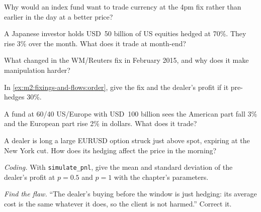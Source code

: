 \begin{exercise}[$\star$]\label{exo:m2:fixings-and-flows:1}
Why would an index fund want to trade currency at the 4pm fix rather than earlier
in the day at a better price?
\end{exercise}

\begin{exercise}[$\star$]\label{exo:m2:fixings-and-flows:2}
A Japanese investor holds USD~50 billion of US equities hedged at 70\%. They rise
3\% over the month. What does it trade at month-end?
\end{exercise}

\begin{exercise}[$\star$]\label{exo:m2:fixings-and-flows:3}
What changed in the WM/Reuters fix in February 2015, and why does it make
manipulation harder?
\end{exercise}

\begin{exercise}[$\star\star$]\label{exo:m2:fixings-and-flows:4}
In \cref{ex:m2:fixings-and-flows:order}, give the fix and the dealer's profit if
it pre-hedges 30\%.
\end{exercise}

\begin{exercise}[$\star\star$]\label{exo:m2:fixings-and-flows:5}
A fund at 60/40 US/Europe with USD~100 billion sees the American part fall 3\%
and the European part rise 2\% in dollars. What does it trade?
\end{exercise}

\begin{exercise}[$\star\star$]\label{exo:m2:fixings-and-flows:6}
A dealer is long a large EURUSD option struck just above spot, expiring at the
New York cut. How does its hedging affect the price in the morning?
\end{exercise}

\begin{exercise}[$\star\star\star$]\label{exo:m2:fixings-and-flows:7}
\emph{Coding.} With \texttt{simulate\_pnl}, give the mean and standard deviation of
the dealer's profit at $p = 0.5$ and $p = 1$ with the chapter's parameters.
\end{exercise}

\begin{exercise}[$\star\star\star$]\label{exo:m2:fixings-and-flows:8}
\emph{Find the flaw.} ``The dealer's buying before the window is just hedging:
its average cost is the same whatever it does, so the client is not harmed.''
Correct it.
\end{exercise}

